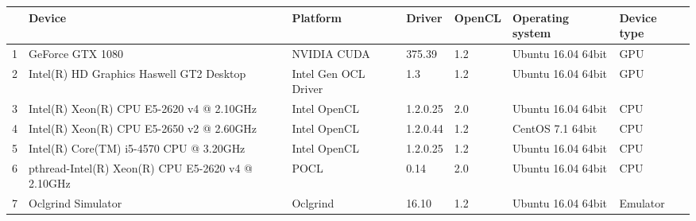 \begin{tabular}{lllllll}
\toprule
{} &                                             Device &              Platform &    Driver & OpenCL &    Operating system & Device type \\
\midrule
1 &                                   GeForce GTX 1080 &           NVIDIA CUDA &    375.39 &    1.2 &  Ubuntu 16.04 64bit &         GPU \\
2 &           Intel(R) HD Graphics Haswell GT2 Desktop &  Intel Gen OCL Driver &       1.3 &    1.2 &  Ubuntu 16.04 64bit &         GPU \\
3 &          Intel(R) Xeon(R) CPU E5-2620 v4 @ 2.10GHz &          Intel OpenCL &  1.2.0.25 &    2.0 &  Ubuntu 16.04 64bit &         CPU \\
4 &          Intel(R) Xeon(R) CPU E5-2650 v2 @ 2.60GHz &          Intel OpenCL &  1.2.0.44 &    1.2 &    CentOS 7.1 64bit &         CPU \\
5 &            Intel(R) Core(TM) i5-4570 CPU @ 3.20GHz &          Intel OpenCL &  1.2.0.25 &    1.2 &  Ubuntu 16.04 64bit &         CPU \\
6 &  pthread-Intel(R) Xeon(R) CPU E5-2620 v4 @ 2.10GHz &                  POCL &      0.14 &    2.0 &  Ubuntu 16.04 64bit &         CPU \\
7 &                                 Oclgrind Simulator &              Oclgrind &     16.10 &    1.2 &  Ubuntu 16.04 64bit &    Emulator \\
\bottomrule
\end{tabular}
